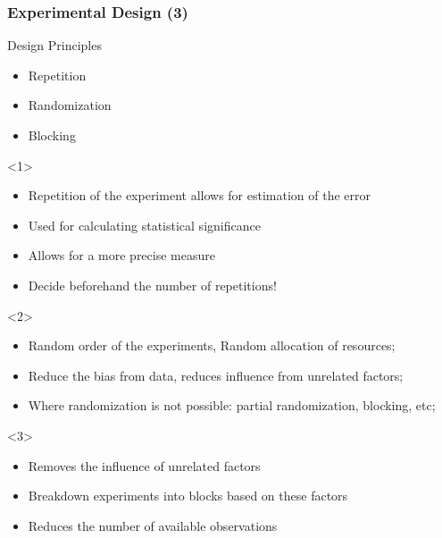\documentclass{beamer}
\begin{document}
\begin{frame}
  \frametitle{Experimental Design (3)}
  \begin{block}{Design Principles}
    \begin{itemize}
      \item \alert<1>{Repetition}
      \item \alert<2>{Randomization}
      \item \alert<3>{Blocking}
    \end{itemize}
  \end{block}

  \begin{onlyenv}<1>
    \\
    \medskip
    
    \begin{itemize}
      \item {\small Repetition of the experiment allows for estimation of the error}
      \item {\small Used for calculating statistical significance}
      \item {\small Allows for a more precise measure}
      \item {\small Decide beforehand the number of repetitions!}
    \end{itemize}
  \end{onlyenv}

  \begin{onlyenv}<2>
    \\
    \medskip
    
    \begin{itemize}
    \item {\small Random order of the experiments, Random allocation of
      resources;}
    \item {\small Reduce the bias from data, reduces influence from unrelated
      factors;}
    \item {\small Where randomization is not possible: partial
      randomization, blocking, etc;}
    \end{itemize}
  \end{onlyenv}

  \begin{onlyenv}<3>
    \\
    \medskip
    
    \begin{itemize}
    \item {\small Removes the influence of unrelated factors}
    \item {\small Breakdown experiments into blocks based on these factors}
    \item {\small Reduces the number of available observations}
    \end{itemize}
  \end{onlyenv}
\end{frame}
\end{document}
